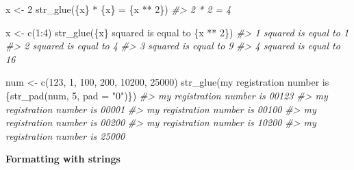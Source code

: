 \documentclass[
]{book}
\newenvironment{Shaded}{\begin{snugshade}}{\end{snugshade}}
\newcommand{\CommentTok}[1]{\textcolor[rgb]{0.56,0.35,0.01}{\textit{#1}}}
\newcommand{\DecValTok}[1]{\textcolor[rgb]{0.00,0.00,0.81}{#1}}
\newcommand{\FunctionTok}[1]{\textcolor[rgb]{0.00,0.00,0.00}{#1}}
\newcommand{\NormalTok}[1]{#1}
\newcommand{\OtherTok}[1]{\textcolor[rgb]{0.56,0.35,0.01}{#1}}
\newcommand{\SpecialCharTok}[1]{\textcolor[rgb]{0.00,0.00,0.00}{#1}}
\newcommand{\StringTok}[1]{\textcolor[rgb]{0.31,0.60,0.02}{#1}}
\begin{document}
\begin{Shaded}
\begin{Highlighting}[]
\NormalTok{x }\OtherTok{\textless{}{-}} \DecValTok{2}
\FunctionTok{str\_glue}\NormalTok{(}\StringTok{\textquotesingle{}\{x\} * \{x\} = \{x ** 2\}\textquotesingle{}}\NormalTok{)}
\CommentTok{\#\textgreater{} 2 * 2 = 4}

\NormalTok{x }\OtherTok{\textless{}{-}} \FunctionTok{c}\NormalTok{(}\DecValTok{1}\SpecialCharTok{:}\DecValTok{4}\NormalTok{)}
\FunctionTok{str\_glue}\NormalTok{(}\StringTok{\textquotesingle{}\{x\} squared is equal to \{x ** 2\}\textquotesingle{}}\NormalTok{)}
\CommentTok{\#\textgreater{} 1 squared is equal to 1}
\CommentTok{\#\textgreater{} 2 squared is equal to 4}
\CommentTok{\#\textgreater{} 3 squared is equal to 9}
\CommentTok{\#\textgreater{} 4 squared is equal to 16}

\NormalTok{num }\OtherTok{\textless{}{-}} \FunctionTok{c}\NormalTok{(}\DecValTok{123}\NormalTok{, }\DecValTok{1}\NormalTok{, }\DecValTok{100}\NormalTok{, }\DecValTok{200}\NormalTok{, }\DecValTok{10200}\NormalTok{, }\DecValTok{25000}\NormalTok{)}
\FunctionTok{str\_glue}\NormalTok{(}\StringTok{\textquotesingle{}my registration number is \{str\_pad(num, 5, pad = "0")\}\textquotesingle{}}\NormalTok{)}
\CommentTok{\#\textgreater{} my registration number is 00123}
\CommentTok{\#\textgreater{} my registration number is 00001}
\CommentTok{\#\textgreater{} my registration number is 00100}
\CommentTok{\#\textgreater{} my registration number is 00200}
\CommentTok{\#\textgreater{} my registration number is 10200}
\CommentTok{\#\textgreater{} my registration number is 25000}
\end{Highlighting}
\end{Shaded}

\textbf{Formatting with strings}
\end{document}
